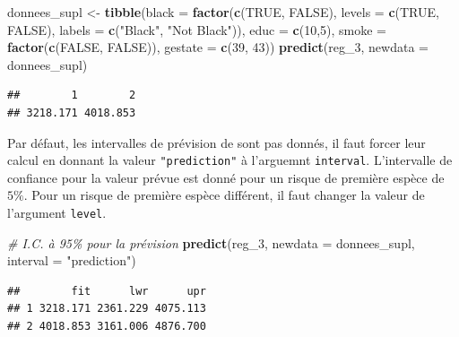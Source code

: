 \documentclass[
  11pt,
]{book}
\newenvironment{Shaded}{\begin{snugshade}}{\end{snugshade}}
\newcommand{\CommentTok}[1]{\textcolor[rgb]{0.56,0.35,0.01}{\textit{#1}}}
\newcommand{\DataTypeTok}[1]{\textcolor[rgb]{0.13,0.29,0.53}{#1}}
\newcommand{\DecValTok}[1]{\textcolor[rgb]{0.00,0.00,0.81}{#1}}
\newcommand{\KeywordTok}[1]{\textcolor[rgb]{0.13,0.29,0.53}{\textbf{#1}}}
\newcommand{\NormalTok}[1]{#1}
\newcommand{\OtherTok}[1]{\textcolor[rgb]{0.56,0.35,0.01}{#1}}
\newcommand{\StringTok}[1]{\textcolor[rgb]{0.31,0.60,0.02}{#1}}
\numberwithin{equation}{section}
\numberwithin{countremarque}{section}
\begin{document}
\begin{Shaded}
\begin{Highlighting}[]
\NormalTok{donnees\_supl \textless{}{-}}\StringTok{ }
\StringTok{  }\KeywordTok{tibble}\NormalTok{(}\DataTypeTok{black =} \KeywordTok{factor}\NormalTok{(}\KeywordTok{c}\NormalTok{(}\OtherTok{TRUE}\NormalTok{, }\OtherTok{FALSE}\NormalTok{),}
                        \DataTypeTok{levels =} \KeywordTok{c}\NormalTok{(}\OtherTok{TRUE}\NormalTok{, }\OtherTok{FALSE}\NormalTok{),}
                        \DataTypeTok{labels =} \KeywordTok{c}\NormalTok{(}\StringTok{"Black"}\NormalTok{, }\StringTok{"Not Black"}\NormalTok{)),}
         \DataTypeTok{educ =} \KeywordTok{c}\NormalTok{(}\DecValTok{10}\NormalTok{,}\DecValTok{5}\NormalTok{),}
         \DataTypeTok{smoke =} \KeywordTok{factor}\NormalTok{(}\KeywordTok{c}\NormalTok{(}\OtherTok{FALSE}\NormalTok{, }\OtherTok{FALSE}\NormalTok{)),}
         \DataTypeTok{gestate =} \KeywordTok{c}\NormalTok{(}\DecValTok{39}\NormalTok{, }\DecValTok{43}\NormalTok{))}
\KeywordTok{predict}\NormalTok{(reg\_}\DecValTok{3}\NormalTok{, }\DataTypeTok{newdata =}\NormalTok{ donnees\_supl)}
\end{Highlighting}
\end{Shaded}

\begin{lstlisting}
##        1        2 
## 3218.171 4018.853
\end{lstlisting}

Par défaut, les intervalles de prévision de sont pas donnés, il faut forcer leur calcul en donnant la valeur \texttt{"prediction"} à l'arguemnt \texttt{interval}. L'intervalle de confiance pour la valeur prévue est donné pour un risque de première espèce de \(5\%\). Pour un risque de première espèce différent, il faut changer la valeur de l'argument \texttt{level}.

\begin{Shaded}
\begin{Highlighting}[]
\CommentTok{\# I.C. à 95\% pour la prévision}
\KeywordTok{predict}\NormalTok{(reg\_}\DecValTok{3}\NormalTok{, }\DataTypeTok{newdata =}\NormalTok{ donnees\_supl, }\DataTypeTok{interval =} \StringTok{"prediction"}\NormalTok{)}
\end{Highlighting}
\end{Shaded}

\begin{lstlisting}
##        fit      lwr      upr
## 1 3218.171 2361.229 4075.113
## 2 4018.853 3161.006 4876.700
\end{lstlisting}
\end{document}
